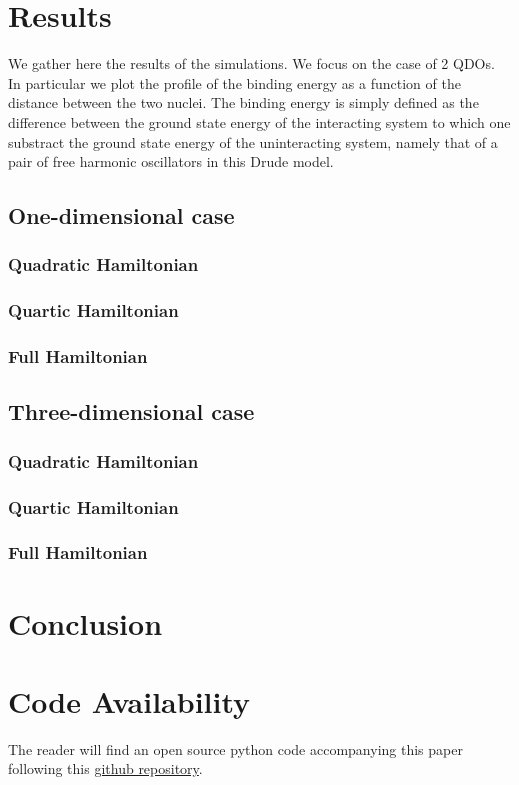 \documentclass[reprint, amsmath, amssymb, aps]{revtex4-2}
\begin{document}
\section{Results}
    We gather here the results of the simulations. We focus on the case of 2 QDOs. In particular we plot the profile of the binding energy as a function of the distance between the two nuclei. The binding energy is simply defined as the difference between the ground state energy of the interacting system to which one substract the ground state energy of the uninteracting system, namely that of a pair of free harmonic oscillators in this Drude model.

    \subsection{One-dimensional case}
        \subsubsection{Quadratic Hamiltonian}
        \subsubsection{Quartic Hamiltonian}
        \subsubsection{Full Hamiltonian}

    \subsection{Three-dimensional case}
        \subsubsection{Quadratic Hamiltonian}
        \subsubsection{Quartic Hamiltonian}
        \subsubsection{Full Hamiltonian}
\section{Conclusion}

\begin{acknowledgments}

\end{acknowledgments}

\section*{Code Availability}

The reader will find an open source python code accompanying this paper following this \href{https://github.com/MatthieuSarkis/qdo}{github repository}.

\appendix

\nocite{*}


\end{document}
